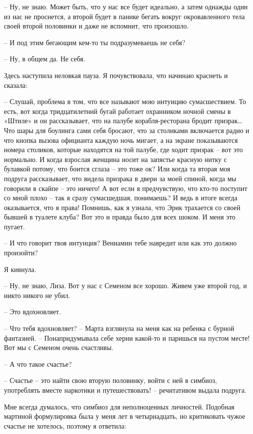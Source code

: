 \documentclass[
]{book}
\begin{document}
-- Ну, не знаю. Может быть, что у нас все будет идеально, а затем однажды один из нас не проснется, а второй будет в панике бегать вокруг окровавленного тела своей второй половинки и даже не вспомнит, что произошло.

-- И под этим бегающим кем-то ты подразумеваешь не себя?

-- Ну, в общем да. Не себя.

Здесь наступила неловкая пауза. Я почувствовала, что начинаю краснеть и сказала:

-- Слушай, проблема в том, что все называют мою интуицию сумасшествием. То есть, вот когда тридцатилетний бугай работает охранником ночной смены в «Штиле» и он рассказывает, что на палубе корабля-ресторана бродит призрак\ldots{} Что шары для боулинга сами себя бросают, что за столиками включается радио и что кнопка вызова официанта каждую ночь мигает, а на экране показываются номера столиков, которые находятся на той палубе, где ходит призрак -- вот это нормально. И когда взрослая женщина носит на запястье красную нитку с булавкой потому, что боится сглаза -- это тоже ок? Или когда та вторая моя подруга рассказывает, что видела призрака в двери за моей спиной, когда мы говорили в скайпе -- это ничего! А вот если я предчувствую, что кто-то поступит со мной плохо -- так я сразу сумасшедшая, понимаешь? И ведь в итоге всегда оказывается, что я права! Помнишь, как я узнала, что Эрик трахается со своей бывшей в туалете клуба? Вот это и правда было для всех шоком. И меня это пугает.

-- И что говорит твоя интуиция? Вениамин тебе навредит или как это должно произойти?

Я кивнула.

-- Ну, не знаю, Лиза. Вот у нас с Семеном все хорошо. Живем уже второй год, и никто никого не убил.

-- Это вдохновляет.

-- Что тебя вдохновляет? -- Марта взглянула на меня как на ребенка с бурной фантазией. -- Понапридумывала себе херни какой-то и паришься на пустом месте! Вот мы с Семеном очень счастливы.

-- А что такое счастье?

-- Счастье -- это найти свою вторую половинку, войти с ней в симбиоз, употреблять вместе наркотики и путешествовать! -- речитативом выдала подруга.

Мне всегда думалось, что симбиоз для неполноценных личностей. Подобная мартиной формулировка была у меня лет в четырнадцать, но критиковать чужое счастье не хотелось, поэтому я ответила:
\end{document}
